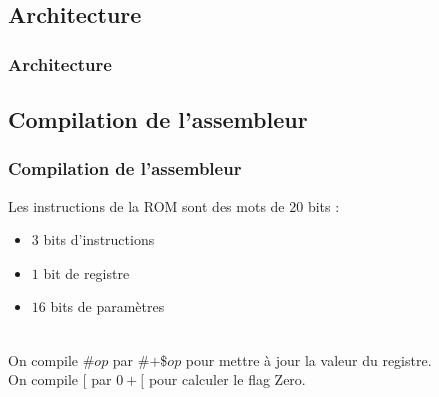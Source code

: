 \documentclass{beamer}
\begin{document}
	\subsection{Architecture}
	\begin{frame}
		\frametitle{Architecture}

	\end{frame}

	\subsection{Compilation de l'assembleur}
	\begin{frame}
		\frametitle{Compilation de l'assembleur}
		Les instructions de la ROM sont des mots de $20$ bits :
		\pause
		\begin{itemize}
			\item $3$ bits d'instructions
			\pause
			\item $1$ bit de registre
			\pause
			\item $16$ bits de paramètres
		\end{itemize}
		\pause
		~\\
		On compile \#$op$ par \#$+$\$$op$ pour mettre à jour la valeur du
		registre.\pause \\
		On compile $[$ par $0+[$ pour calculer le flag Zero.
	\end{frame}
\end{document}
